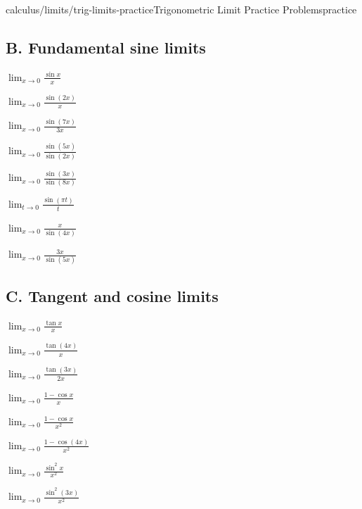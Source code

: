 \documentclass[11pt,openany]{book}
\theoremstyle{bgplain}
\begin{document}
\begin{webpage}{calculus/limits/trig-limits-practice}{Trigonometric Limit Practice Problems}{practice}
\subsection*{B. Fundamental sine limits}
\begin{bgexercises}[label=\textbf{3.\arabic*},resume]
  \item \(\displaystyle\lim_{x\to0}\frac{\sin x}{x}\)
  \item \(\displaystyle\lim_{x\to0}\frac{\sin(2x)}{x}\)
  \item \(\displaystyle\lim_{x\to0}\frac{\sin(7x)}{3x}\)
  \item \(\displaystyle\lim_{x\to0}\frac{\sin(5x)}{\sin(2x)}\)
  \item \(\displaystyle\lim_{x\to0}\frac{\sin(3x)}{\sin(8x)}\)
  \item \(\displaystyle\lim_{t\to0}\frac{\sin(\pi t)}{t}\)
  \item \(\displaystyle\lim_{x\to0}\frac{x}{\sin(4x)}\)
  \item \(\displaystyle\lim_{x\to0}\frac{3x}{\sin(5x)}\)
\end{bgexercises}

\subsection*{C. Tangent and cosine limits}
\begin{bgexercises}[label=\textbf{3.\arabic*},resume]
  \item \(\displaystyle\lim_{x\to0}\frac{\tan x}{x}\)
  \item \(\displaystyle\lim_{x\to0}\frac{\tan(4x)}{x}\)
  \item \(\displaystyle\lim_{x\to0}\frac{\tan(3x)}{2x}\)
  \item \(\displaystyle\lim_{x\to0}\frac{1-\cos x}{x}\)
  \item \(\displaystyle\lim_{x\to0}\frac{1-\cos x}{x^2}\)
  \item \(\displaystyle\lim_{x\to0}\frac{1-\cos(4x)}{x^2}\)
  \item \(\displaystyle\lim_{x\to0}\frac{\sin^2x}{x^2}\)
  \item \(\displaystyle\lim_{x\to0}\frac{\sin^2(3x)}{x^2}\)
\end{bgexercises}


\end{webpage}
\end{document}
